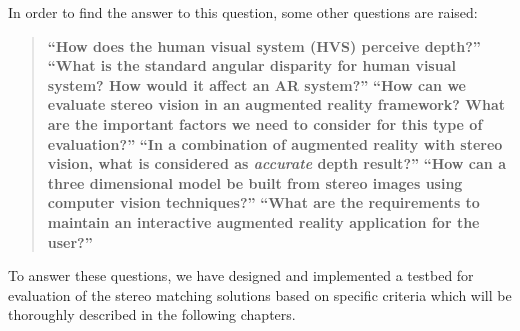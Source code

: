 In order to find the answer to this question, some other questions are raised:
\begin{quote}
\textbf {``How does the human visual system (HVS) perceive depth?''}\newline
\textbf {``What is the standard angular disparity for human visual system? How would it affect an AR system?''} \newline
\textbf {``How can we evaluate stereo vision in an augmented reality framework? What are the important factors we need to consider for 
	this type of evaluation?''} \newline
\textbf {``In a combination of augmented reality with stereo vision, what is considered as \textbf{\textit {accurate}} depth result?''} \newline
\textbf {``How can a three dimensional model be built from stereo images using computer vision techniques?''}\newline
\textbf {``What are the requirements to maintain an interactive augmented reality application for the user?''} \newline
\end{quote}

To answer these questions, we have designed and implemented a testbed for evaluation of
the stereo matching solutions based on specific criteria which will be thoroughly described in the following chapters.

